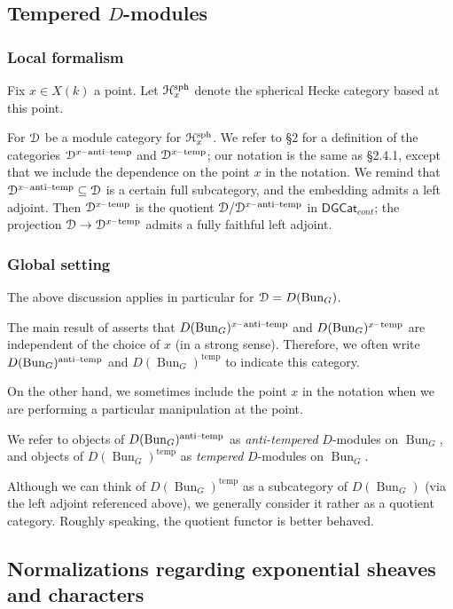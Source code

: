 \documentclass[reqno,11pt]{amsart}
\numberwithin{equation}{subsection}
\theoremstyle{remark}
\newcommand{\sD}{{\EuScript D}}
\newcommand{\sH}{{\EuScript H}}
\newcommand{\on}{\operatorname}
\newcommand{\mathendash}{\text{\textendash}}
\newcommand{\Bun}{\on{Bun}}
\newcommand{\DGCat}{\mathsf{DGCat}}
\renewcommand{\subset}{\subseteq}
\newcommand{\temp}{\on{temp}}
\newcommand{\at}{\on{anti}\!\mathendash\!\on{temp}}
\newcommand{\xat}{x\mathendash\on{anti}\!\mathendash\!\on{temp}}
\newcommand{\xtemp}{x\mathendash\on{temp}}
\begin{document}
\subsection{Tempered $D$-modules}

\subsubsection{Local formalism}

Fix $x \in X(k)$ a point. Let $\sH_x^{\on{sph}}$ denote the spherical
Hecke category based at this point.

For $\sD$ be a module category for $\sH_x^{\on{sph}}$. 
We refer to \cite{dario-ramanujan} \S 2 for a definition of
the categories $\sD^{\xat}$ and $\sD^{\xtemp}$; our notation 
is the same as \cite{dario-ramanujan} \S 2.4.1, except that we
include the dependence on the point $x$ in the notation.
We remind that $\sD^{\xat} \subset \sD$ is a certain full
subcategory, and the embedding admits a left adjoint.
Then $\sD^{\xtemp}$ is the quotient $\sD/\sD^{\xat}$ in $\DGCat_{cont}$;
the projection $\sD \to \sD^{\xtemp}$ admits a fully faithful left adjoint.

\subsubsection{Global setting}

The above discussion applies in particular for $\sD = D(\Bun_G)$.

The main result of \cite{independence} asserts that $D(\Bun_G)^{\xat}$
and $D(\Bun_G)^{\xtemp}$ are independent of the choice of $x$ (in a strong sense).
Therefore, we often write $D(\Bun_G)^{\at}$ and $D(\Bun_G)^{\temp}$ to
indicate this category. 

On the other hand, we sometimes include the point $x$ in the
notation when we are performing a particular manipulation at the point. 

We refer to objects of $D(\Bun_G)^{\at}$ as \emph{anti-tempered} $D$-modules
on $\Bun_G$, and objects of $D(\Bun_G)^{\temp}$ as \emph{tempered} $D$-modules
on $\Bun_G$. 

Although we can think of $D(\Bun_G)^{\temp}$ as a subcategory of
$D(\Bun_G)$ (via the left adjoint referenced above), we generally consider
it rather as a quotient category. Roughly speaking, the quotient
functor is better behaved.

\subsection{Normalizations regarding exponential sheaves and characters}
\end{document}
